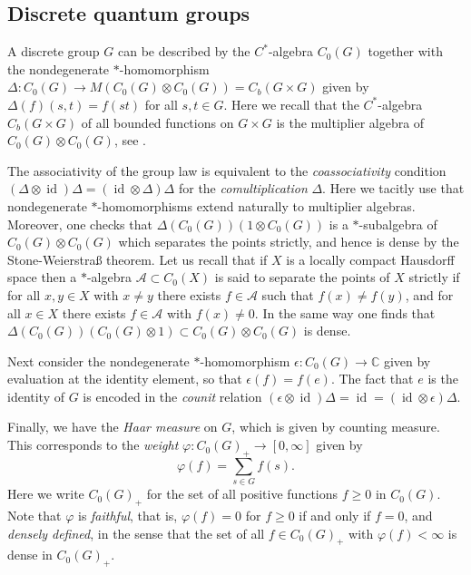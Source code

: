\documentclass[a4paper]{amsart}
\DeclareMathOperator{\id}{id}
\numberwithin{equation}{section}
\theoremstyle{change}
\begin{document}
\subsection{Discrete quantum groups} \label{sec_dqg}

A discrete group $ G $ can be described by the $ C^* $-algebra $ C_0(G) $ 
together with the nondegenerate $ * $-homomorphism $ \Delta: C_0(G) \rightarrow M(C_0(G) \otimes C_0(G)) = C_b(G \times G) $ given by $ \Delta(f)(s,t) = f(st) $ for all $ s,t \in G $. Here we recall that the $ C^* $-algebra $ C_b(G \times G) $ of all bounded functions on $ G \times G $ is the multiplier algebra of $ C_0(G) \otimes C_0(G) $, see \cite[Example 3.1.3]{MURPHY_book}.  

The associativity of the group law is equivalent to the \emph{coassociativity} condition $ (\Delta \otimes \id) \Delta = (\id \otimes \Delta) \Delta $ for the \emph{comultiplication} $ \Delta $. Here we tacitly use that nondegenerate $ * $-homomorphisms extend naturally to multiplier algebras. 
Moreover, one checks that $ \Delta(C_0(G))(1 \otimes C_0(G)) $ is a $ * $-subalgebra of $ C_0(G) \otimes C_0(G) $ which separates the points strictly, and hence is 
dense by the Stone-Weierstra{\ss} theorem. Let us recall that if $ X $ is a locally compact Hausdorff space then a $ * $-algebra $ \mathcal{A} \subset C_0(X) $ is said to separate the points of $ X $ strictly if for all $ x, y \in X $ with $ x \neq y $ there exists $ f \in \mathcal{A} $ such that $ f(x) \neq f(y) $, and for all $ x \in X $ there exists $ f \in \mathcal{A} $ with $ f(x) \neq 0 $. 
In the same way one finds that $ \Delta(C_0(G))(C_0(G) \otimes 1) \subset C_0(G) \otimes C_0(G) $ is dense. 

Next consider the nondegenerate $ * $-homomorphism $ \epsilon: C_0(G) \rightarrow \mathbb{C} $ given by evaluation at the identity element, 
so that $ \epsilon(f) = f(e) $. The fact that $ e $ is the identity of $ G $ is encoded in the \emph{counit} relation $ (\epsilon \otimes \id)\Delta = \id = (\id \otimes \epsilon)\Delta $. 

Finally, we have the \emph{Haar measure} on $ G $, which is given by counting measure. This corresponds to the \emph{weight} $ \varphi: C_0(G)_+ \rightarrow [0, \infty] $ 
given by  
$$
\varphi(f) = \sum_{s \in G} f(s). 
$$
Here we write $ C_0(G)_+ $ for the set of all positive functions $ f \geq 0 $ in $ C_0(G) $. 
Note that $ \varphi $ is \emph{faithful}, that is, $ \varphi(f) = 0 $ for $ f \geq 0 $ if and only if $ f = 0 $, and \emph{densely defined}, in the sense that the set of all $ f \in C_0(G)_+ $ with $ \varphi(f) < \infty $ is dense in $ C_0(G)_+ $. 
\end{document}
